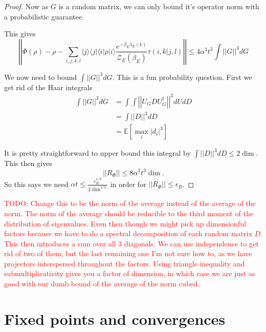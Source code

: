 \documentclass{article}
\newcommand{\ket}[1]{|#1\rangle}
\newcommand{\bra}[1]{\langle #1|}
\newcommand{\ketbra}[2]{| #1\rangle\! \langle #2|}
\newcommand{\brackets}[1]{\left[ #1 \right]}
\newcommand{\norm}[1]{\left| \left| #1 \right| \right|}
\newcommand{\expect}[1]{\mathbb{E}\brackets{#1}}
\newcommand{\partfun}{\mathcal{Z}}
\begin{document}
\begin{proof}
Now as $G$ is a random matrix, we can only bound it's operator norm with a probabilistic guarantee. 

This gives
\begin{equation}
    \norm{\Phi(\rho) - \rho - \sum_{i,j,k,l} \ketbra{j}{j} \bra{i} \rho \ket{i} \frac{e^{-\beta_E \lambda_E(k)}}{\partfun_E(\beta_E)} \tau(i,k | j, l) } \leq 4 \alpha^3 t^3 \int \norm{G}^3 dG
\end{equation}

We now need to bound $\int \norm{G}^3 dG$. This is a fun probability question. First we get rid of the Haar integrals
\begin{align}
    \int \norm{G}^3 dG &= \int \int \norm{U_G D U_G^\dagger}^3  dU dD \\
    &= \int \norm{D}^3 dD \\
    &= \expect{\max_i |d_i|^3}
\end{align}

It is pretty straightforward to upper bound this integral by $\int \norm{D}^3 dD \leq 2 \dim$. This then gives
\begin{equation}
    \norm{R_{\Phi}} \leq 8 \alpha^3 t^3 \dim.
\end{equation}
So this says we need $\alpha t \leq \frac{\epsilon_{R}^{1/3}}{2 \dim^{1/3}}$ in order for $\norm{R_{\Phi}} \leq \epsilon_R$.
\end{proof}

\textcolor{red}{TODO: Change this to be the norm of the average instead of the average of the norm. The norm of the average should be reducible to the third moment of the distribution of eigenvalues. Even then though we might pick up dimensionful factors because we have to do a spectral decomposition of each random matrix $D$. This then introduces a sum over all 3 diagonals. We can use independence to get rid of two of them, but the last remaining one I'm not sure how to, as we have projectors interspersed throughout the factors. Using triangle inequality and submultiplicativity gives you a factor of dimension, in which case we are just as good with our dumb bound of the average of the norm cubed.}

\section{Fixed points and convergences}
\end{document}
